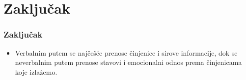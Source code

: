 \documentclass[13pt]{beamer}
\begin{document}
\section{Zaključak}

\begin{frame}[fragile]\frametitle{Zaključak}
	\begin{itemize}	
		\begin{itemize}
			\item samo 8\% poruke se prenese samim rečima (verbalna komunikacija)
			\item 37\% se prenesi bojom glasa, tonalitetom, pauzama u govoru (paralingvističkim znakovima)
			\item 55\% poruke se prenosi govorom tela: pratećim pokretima, izrazom lica i
			očiju, stavom tela i drugo (neverbalna komunikacija)
		\end{itemize}
		\item Verbalnim putem se najčešće prenose činjenice i
		sirove informacije, dok se neverbalnim putem prenose stavovi i
		emocionalni odnos prema činjenicama koje izlažemo.
	\end{itemize}
\end{frame}
\end{document}
